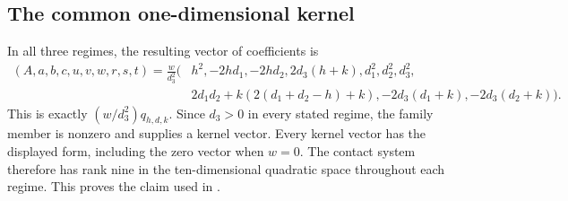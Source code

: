 \subsection{The common one-dimensional kernel}

In all three regimes, the resulting vector of coefficients is
\begin{align*}
 (A,a,b,c,u,v,w,r,s,t)=\frac{w}{d_3^2}\bigl(&h^2,-2hd_1,-2hd_2,
       2d_3(h+k),d_1^2,d_2^2,d_3^2,\\
       &2d_1d_2+k(2(d_1+d_2-h)+k),
       -2d_3(d_1+k),-2d_3(d_2+k)\bigr).
\end{align*}
This is exactly $(w/d_3^2)q_{h,d,k}$. Since $d_3>0$ in every stated
regime, the family member is nonzero and supplies a kernel vector.
Every kernel vector has the displayed form, including the zero vector
when $w=0$. The contact system therefore has rank nine in the
ten-dimensional quadratic space throughout each regime. This proves
the claim used in .
